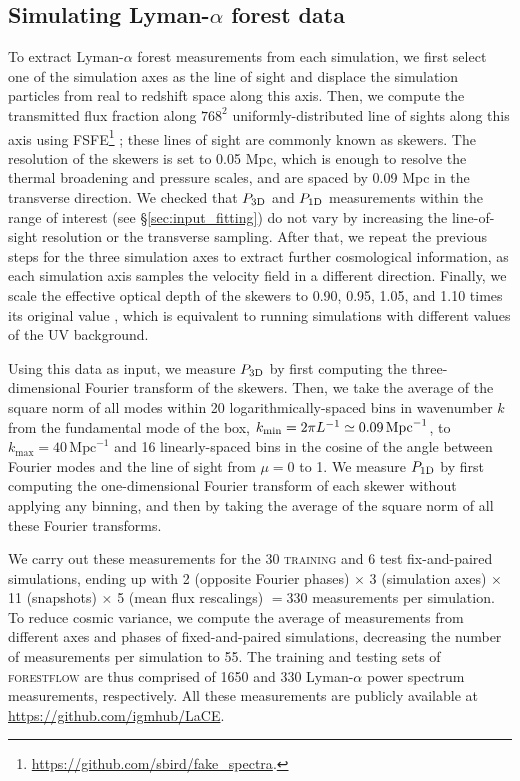 \documentclass[fleqn,usenatbib]{mnras}
\newcommand{\lya}{Lyman-$\alpha$\xspace}
\newcommand{\lyaf}{Lyman-$\alpha$ forest\xspace}
\newcommand{\poned}{\ensuremath{P_{\rm 1D}}\xspace}
\newcommand{\pthreed}{\ensuremath{P_{\rm 3D}}\xspace}
\newcommand{\forestflow}{\textsc{forestflow}\xspace}
\newcommand{\lacehc}{\textsc{training}\xspace}
\newcommand{\iMpc}{\ensuremath{\,\mathrm{Mpc}^{-1}}}
\begin{document}

\subsection{Simulating \lyaf data}
\label{sec:input_extract_lya}

To extract \lyaf measurements from each simulation, we first select one of the simulation axes as the line of sight and displace the simulation particles from real to redshift space along this axis. Then, we compute the transmitted flux fraction along $768^2$ uniformly-distributed line of sights along this axis using \textsc{FSFE}\footnote{\url{https://github.com/sbird/fake_spectra}.} \citep{bird2017FSFEFakeSpectra}; these lines of sight are commonly known as skewers. The resolution of the skewers is set to 0.05 Mpc, which is enough to resolve the thermal broadening and pressure scales, and are spaced by 0.09 Mpc in the transverse direction. We checked that \pthreed and \poned measurements within the range of interest (see \S\ref{sec:input_fitting}) do not vary by increasing the line-of-sight resolution or the transverse sampling. After that, we repeat the previous steps for the three simulation axes to extract further cosmological information, as each simulation axis samples the velocity field in a different direction. Finally, we scale the effective optical depth of the skewers to 0.90, 0.95, 1.05, and 1.10 times its original value \citep[see][for more details about this approach]{hydro_Lukic2015}, which is equivalent to running simulations with different values of the UV background.

Using this data as input, we measure \pthreed by first computing the three-dimensional Fourier transform of the skewers. Then, we take the average of the square norm of all modes within 20 logarithmically-spaced bins in wavenumber $k$ from the fundamental mode of the box, $k_\mathrm{min}=2\upi L^{-1} \simeq 0.09\iMpc$, to $k_\mathrm{max}=40\iMpc$ and 16 linearly-spaced bins in the cosine of the angle between Fourier modes and the line of sight from $\mu=0$ to 1. We measure \poned by first computing the one-dimensional Fourier transform of each skewer without applying any binning, and then by taking the average of the square norm of all these Fourier transforms.

We carry out these measurements for the 30 \lacehc and 6 test fix-and-paired simulations, ending up with 2 (opposite Fourier phases) $\times$ 3 (simulation axes) $\times$ 11 (snapshots) $\times$ 5 (mean flux rescalings) $=330$ measurements per simulation. To reduce cosmic variance, we compute the average of measurements from different axes and phases of fixed-and-paired simulations, decreasing the number of measurements per simulation to 55. The training and testing sets of \forestflow are thus comprised of 1650 and 330 \lya power spectrum measurements, respectively. All these measurements are publicly available at \url{https://github.com/igmhub/LaCE}.
\end{document}
